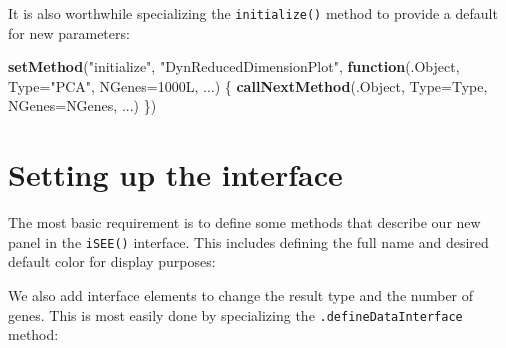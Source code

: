 \documentclass[
]{book}
\newenvironment{Shaded}{\begin{snugshade}}{\end{snugshade}}
\newcommand{\ControlFlowTok}[1]{\textcolor[rgb]{0.13,0.29,0.53}{\textbf{#1}}}
\newcommand{\DataTypeTok}[1]{\textcolor[rgb]{0.13,0.29,0.53}{#1}}
\newcommand{\KeywordTok}[1]{\textcolor[rgb]{0.13,0.29,0.53}{\textbf{#1}}}
\newcommand{\NormalTok}[1]{#1}
\newcommand{\StringTok}[1]{\textcolor[rgb]{0.31,0.60,0.02}{#1}}
\begin{document}
It is also worthwhile specializing the \texttt{initialize()} method to provide a default for new parameters:

\begin{Shaded}
\begin{Highlighting}[]
\KeywordTok{setMethod}\NormalTok{(}\StringTok{"initialize"}\NormalTok{, }\StringTok{"DynReducedDimensionPlot"}\NormalTok{, }
    \ControlFlowTok{function}\NormalTok{(.Object, }\DataTypeTok{Type=}\StringTok{"PCA"}\NormalTok{, }\DataTypeTok{NGenes=}\NormalTok{1000L, ...) }
\NormalTok{\{}
    \KeywordTok{callNextMethod}\NormalTok{(.Object, }\DataTypeTok{Type=}\NormalTok{Type, }\DataTypeTok{NGenes=}\NormalTok{NGenes, ...)}
\NormalTok{\})}
\end{Highlighting}
\end{Shaded}

\hypertarget{setting-up-the-interface}{%
\section{Setting up the interface}\label{setting-up-the-interface}}

The most basic requirement is to define some methods that describe our new panel in the \texttt{iSEE()} interface.
This includes defining the full name and desired default color for display purposes:

\begin{Shaded}
\end{Shaded}

We also add interface elements to change the result type and the number of genes.
This is most easily done by specializing the \texttt{.defineDataInterface} method:
\end{document}
